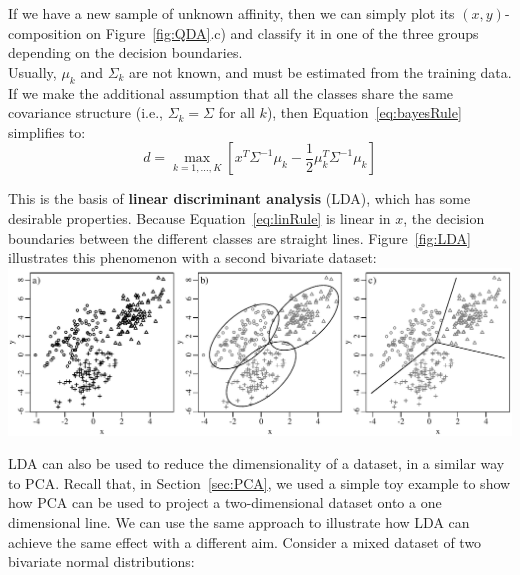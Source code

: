 If we have a new sample of unknown affinity, then we can simply plot
its $(x,y)$-composition on Figure~\ref{fig:QDA}.c) and classify it in
one of the three groups depending on the decision boundaries.\\

Usually, $\mu_k$ and $\Sigma_k$ are not known, and must be estimated
from the training data.  If we make the additional assumption that all
the classes share the same covariance structure (i.e., $\Sigma_k =
\Sigma$ for all $k$), then Equation~\ref{eq:bayesRule} simplifies to:
\begin{equation}
  \label{eq:linRule}
d = \underset{k=1,\ldots,K}{\max}\left[
x^T\Sigma^{-1}\mu_k-\frac{1}{2}\mu_k^T\Sigma^{-1}\mu_k \right]
\end{equation}

This is the basis of \textbf{linear discriminant analysis} (LDA),
which has some desirable properties.  Because
Equation~\ref{eq:linRule} is linear in $x$, the decision boundaries
between the different classes are straight lines. Figure~\ref{fig:LDA}
illustrates this phenomenon with a second bivariate dataset:\\

\noindent\includegraphics[width=\linewidth]{../figures/LDA.pdf}
\begingroup {}
\label{fig:LDA}
\endgroup

LDA can also be used to reduce the dimensionality of a dataset, in a
similar way to PCA. Recall that, in Section~\ref{sec:PCA}, we used a
simple toy example to show how PCA can be used to project a
two-dimensional dataset onto a one dimensional line. We can use the
same approach to illustrate how LDA can achieve the same effect with a
different aim. Consider a mixed dataset of two bivariate normal
distributions:\\

